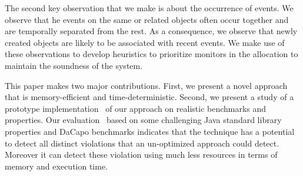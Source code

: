 The second key observation that we make is about the occurrence of events.
We observe that he events on the same or related objects often occur together
and are temporally separated from the rest. As a consequence, we observe
that newly created objects are likely to be associated with recent events.
We make use of these observations to develop heuristics to prioritize monitors
in the allocation to maintain the soundness of the system.


This paper makes two major contributions.
First, we present a novel approach~ that is memory-efficient 
and time-deterministic. Second, we present a study of a prototype 
implementation~ of our approach on realistic 
benchmarks and properties. Our evaluation~ based on some
challenging Java standard library properties and DaCapo benchmarks 
indicates that the technique has a potential to detect all distinct violations that an 
un-optimized approach could detect. Moreover it can detect these violation using
much less resources in terms of memory and execution time.



